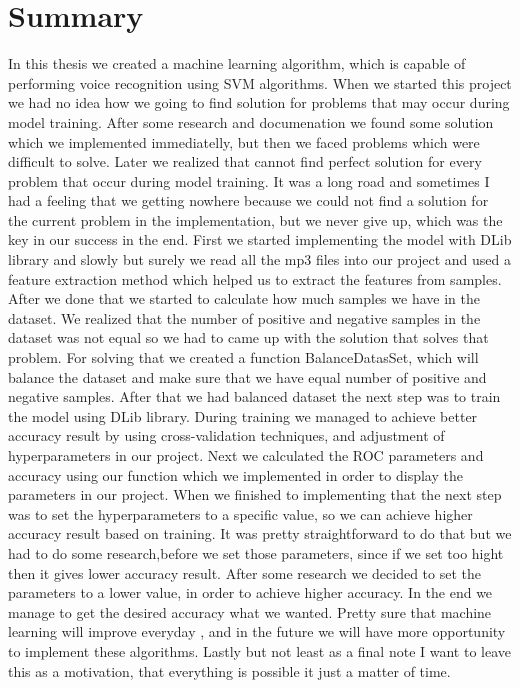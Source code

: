 \documentclass[english,12pt,oneside,a4paper]{article}
\begin{document}
		\section{Summary}
		In this thesis we created a machine learning algorithm, which is capable of performing voice recognition using SVM algorithms. When we started this project we had no idea how we going to find solution for problems that may occur during model training. After some research and documenation we found some solution which we implemented immediatelly, but then we faced problems which were difficult to solve. Later we realized that cannot find perfect solution for every problem that occur during model training. It was a long road and sometimes I had a feeling that we getting nowhere because we could not find a solution for the current problem in the implementation, but we never give up, which was the key in our success in the end. First we started implementing the model with DLib library and slowly but surely we read all the mp3 files into our project and used a feature extraction method which helped us to extract the features from samples. After we done that we started to calculate how much samples we have in the dataset. We realized that the number of positive and negative samples in the dataset was not equal so we had to came up with the solution that solves that problem. For solving that we created a function BalanceDatasSet, which will balance the dataset and make sure that we have equal number of positive and negative samples. After that we had balanced dataset the next step was to train the model using DLib library. During training we managed to achieve better accuracy result by using cross-validation techniques, and  adjustment of hyperparameters in our project. Next we calculated the ROC parameters and accuracy using our function which we implemented in order to display the parameters in our project. When we finished to implementing that the next step was to set the hyperparameters to a specific value, so we can achieve higher accuracy result based on training. It was pretty straightforward to do that but we had to do some research,before we set those parameters, since if we set too hight then it gives lower accuracy result. After some research we decided to set the parameters to a lower value, in order to achieve higher accuracy. In the end we manage to get the desired accuracy what we wanted. Pretty sure that machine learning will improve everyday , and in the future we will have more opportunity to implement these algorithms. Lastly but not least as a final note I want to leave this as a motivation, that everything is possible it just a matter of time.
		\newpage
	
\end{document}
